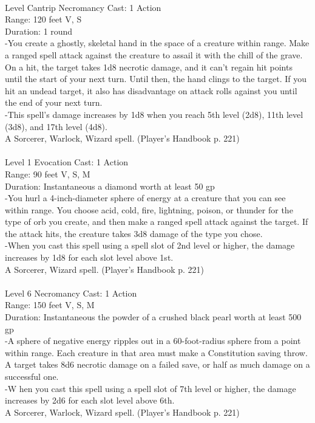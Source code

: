 \documentclass[10pt,twocolumn]{report}
\begin{document}
 \\
Level Cantrip \quad Necromancy \quad Cast: 1 Action\\
Range: 120 feet \quad V, S\\
Duration: 1 round \quad \\
-You create a ghostly, skeletal hand in the space of a creature within range. 
Make a ranged spell attack against the creature to assail it with the chill of the grave. On a hit, the target takes 1d8 necrotic damage, and it can’t regain hit points until the start of your next turn. Until then, the hand clings to the target. If you hit an undead target, it also has disadvantage on attack rolls against you until the end of your next turn.\\
-This spell’s damage increases by 1d8 when you reach 5th level (2d8), 11th level (3d8), and 17th level (4d8).\\
A Sorcerer, Warlock, Wizard spell. (Player's Handbook p. 221) \\


 \\
Level 1 \quad Evocation \quad Cast: 1 Action\\
Range: 90 feet \quad V, S, M \\
Duration: Instantaneous \quad a diamond worth at least 50 gp\\
-You hurl a 4-inch-diameter sphere of energy at a creature that you can see within range. You choose acid, cold, fire, lightning, poison, or thunder for the type of orb you create, and then make a ranged spell attack against the target. If the attack hits, the creature takes 3d8 damage of the type you chose.\\
-When you cast this spell using a spell slot of 2nd level or higher, the damage increases by 1d8 for each slot level above 1st.\\
A Sorcerer, Wizard spell. (Player's Handbook p. 221) \\


 \\
Level 6 \quad Necromancy \quad Cast: 1 Action\\
Range: 150 feet \quad V, S, M \\
Duration: Instantaneous \quad the powder of a crushed black pearl worth at least 500 gp\\
-A sphere of negative energy ripples out in a 60-foot-radius sphere from a point within range. Each creature in that area must make a Constitution saving throw. A target takes 8d6 necrotic damage on a failed save, or half as much damage on a successful one.\\
-W hen you cast this spell using a spell slot of 7th level or higher, the damage increases by 2d6 for each slot level above 6th.\\
A Sorcerer, Warlock, Wizard spell. (Player's Handbook p. 221) \\
\end{document}

